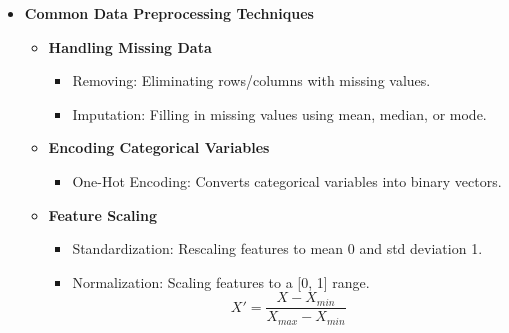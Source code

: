 \documentclass[aspectratio=169]{beamer}
\begin{document}
\begin{frame}[fragile]
\begin{itemize}
        \item \textbf{Common Data Preprocessing Techniques}
            \begin{itemize}
                \item \textbf{Handling Missing Data}
                    \begin{itemize}
                        \item Removing: Eliminating rows/columns with missing values.
                        \item Imputation: Filling in missing values using mean, median, or mode.
                    \end{itemize}
                \item \textbf{Encoding Categorical Variables}
                    \begin{itemize}
                        \item One-Hot Encoding: Converts categorical variables into binary vectors.
                    \end{itemize}
                \item \textbf{Feature Scaling}
                    \begin{itemize}
                        \item Standardization: Rescaling features to mean 0 and std deviation 1.
                        \item Normalization: Scaling features to a [0, 1] range.
                            \begin{equation}
                            X' = \frac{X - X_{min}}{X_{max} - X_{min}}
                            \end{equation}
                    \end{itemize}
            \end{itemize}
    \end{itemize}
\end{frame}
\end{document}
